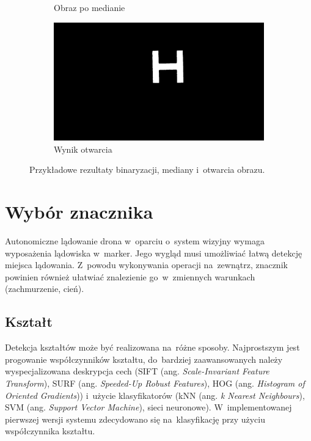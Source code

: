 \begin{figure}
\begin{subfigure}{0.4\textwidth}
		\caption{Obraz po medianie}
		\label{fig:median_1}
	\end{subfigure}
	\begin{subfigure}{0.4\textwidth}
		\centering
		\includegraphics[width=\textwidth]{opened.jpg}
		\caption{Wynik otwarcia}
		\label{fig:opened_1}
	\end{subfigure}
	\caption{Przykładowe rezultaty binaryzacji, mediany i~otwarcia obrazu.}
	\label{fig:operacje}
\end{figure}



\section{Wybór znacznika} 
\label{sec:wybor_znacznika}

Autonomiczne lądowanie drona w~oparciu o~system wizyjny wymaga wyposażenia lądowiska w~marker. 
Jego wygląd musi umożliwiać łatwą detekcję miejsca lądowania. 
Z~powodu wykonywania operacji na~zewnątrz, znacznik powinien również ułatwiać znalezienie go~w~zmiennych warunkach (zachmurzenie, cień).

\subsection{Kształt}
\label{subsec:ksztalt} 
Detekcja kształtów może być realizowana na~różne sposoby. 
Najprostszym jest progowanie współczynników kształtu, do~bardziej zaawansowanych należy wyspecjalizowana deskrypcja cech (SIFT (ang. \textit{Scale-Invariant Feature Transform}), SURF (ang. \textit{Speeded-Up Robust Features}), HOG (ang. \textit{Histogram of Oriented Gradients})) i~użycie klasyfikatorów (kNN (ang. \textit{k Nearest Neighbours}), SVM (ang. \textit{Support Vector Machine}), sieci neuronowe). %
W~implementowanej pierwszej wersji systemu zdecydowano się na~klasyfikację przy użyciu współczynnika kształtu.

